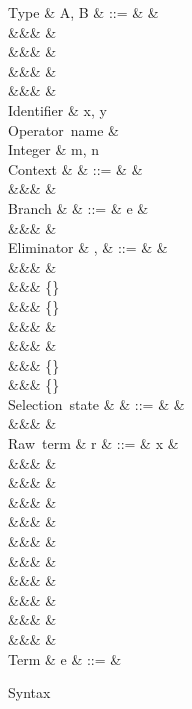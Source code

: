 \begin{figure}
\begin{syntaxfig}
\mbox{Type}
&
A, B
&
::=
&
\tyBool
&
\\
&&&
\tyInt
&
\\
&&&
&
\\
&&&
\tyList{\tyInt}
&
\\
&&&
&
\\[2mm]
\mbox{Identifier}
&
x, y
\\
\mbox{Operator name}
&
\primOp
\\
\mbox{Integer}
&
m, n
\\[2mm]
\mbox{Context}
&
\Gamma
&
::=
&
\cxtEmpty
&
\\
&&&
&
\\[2mm]
\mbox{Branch}
&
\kappa
&
::=
&
e
&
\\
&&&
\sigma
&
\\[2mm]
\mbox{Eliminator}
&
\sigma, \tau
&
::=
&
&
\\
&&&
&
\\
&&&
\{\exTrue \mapsto \kappa\}
\\
&&&
\{\exFalse \mapsto \kappa\}
\\
&&&
\elimProd{\sigma}
&
\\
&&&
\elimList{\branchNil{\kappa}}{\branchCons{\sigma}}
&
\\
&&&
\{\branchNil{\kappa}\}
\\
&&&
\{\branchCons{\sigma}\}
\\[2mm]
\mbox{Selection state}
&
\alpha
&
::=
&
\top
&
\\
&&&
\bot
&
\\[2mm]
\mbox{Raw term}
&
r
&
::=
&
x
&
\\
&&&
\exTrue \mid \exFalse
&
\\
&&&
&
\\
&&&
&
\\
&&&
&
\\
&&&
\exOp{\primOp}
&
\\
&&&
&
\\
&&&
&
\\
&&&
\exNil
&
\\
&&&
&
\\
&&&
&
\\[2mm]
\mbox{Term}
&
e
&
::=
&
\end{syntaxfig}
\caption{Syntax}
\end{figure}
